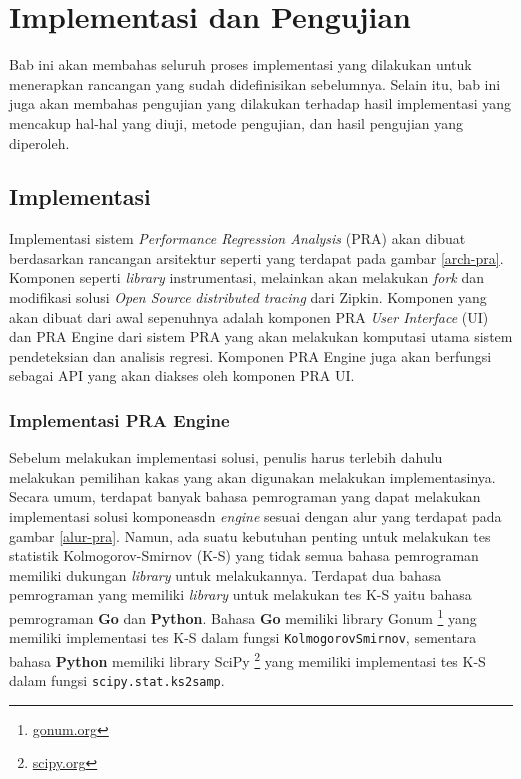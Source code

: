 \chapter{Implementasi dan Pengujian}

Bab ini akan membahas seluruh proses implementasi yang dilakukan untuk menerapkan rancangan yang sudah didefinisikan sebelumnya. Selain itu, bab ini juga akan membahas pengujian yang dilakukan terhadap hasil implementasi yang mencakup hal-hal yang diuji, metode pengujian, dan hasil pengujian yang diperoleh. 


\section{Implementasi}
Implementasi sistem \textit{Performance Regression Analysis} (PRA) akan dibuat berdasarkan rancangan arsitektur seperti yang terdapat pada gambar \ref{arch-pra}. Komponen seperti \textit{library} instrumentasi, melainkan akan melakukan \textit{fork} dan modifikasi solusi \textit{Open Source} \textit{distributed tracing} dari Zipkin. Komponen yang akan dibuat dari awal sepenuhnya adalah komponen PRA \textit{User Interface} (UI) dan PRA Engine dari sistem PRA yang akan melakukan komputasi utama sistem pendeteksian dan analisis regresi. Komponen PRA Engine juga akan berfungsi sebagai API yang akan diakses oleh komponen PRA UI.



\subsection{Implementasi PRA Engine}

Sebelum melakukan implementasi solusi, penulis harus terlebih dahulu melakukan pemilihan kakas yang akan digunakan melakukan implementasinya. Secara umum, terdapat banyak bahasa pemrograman yang dapat melakukan implementasi solusi komponeasdn \textit{engine} sesuai dengan alur yang terdapat pada gambar \ref{alur-pra}. Namun, ada suatu kebutuhan penting untuk melakukan tes statistik Kolmogorov-Smirnov (K-S) yang tidak semua bahasa pemrograman memiliki dukungan \textit{library} untuk melakukannya. Terdapat dua bahasa pemrograman yang memiliki \textit{library} untuk melakukan tes K-S yaitu bahasa pemrograman \textbf{Go} dan \textbf{Python}. Bahasa \textbf{Go} memiliki library Gonum \footnote{\url{gonum.org}} yang memiliki implementasi tes K-S dalam fungsi \texttt{KolmogorovSmirnov}, sementara bahasa \textbf{Python} memiliki library SciPy \footnote{\url{scipy.org}} yang memiliki implementasi tes K-S dalam fungsi \texttt{scipy.stat.ks\textunderscore 2samp}.

